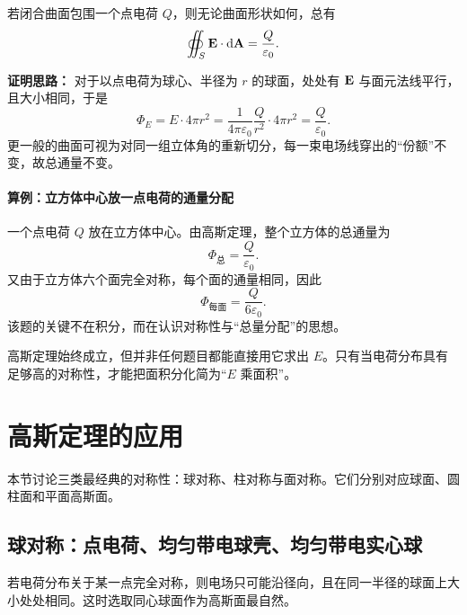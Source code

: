 \begin{theorem}[点电荷情形下高斯定理的验证]
若闭合曲面包围一个点电荷 $Q$，则无论曲面形状如何，总有
\begin{equation}
\oiint_S \vb{E}\cdot\dd\vb{A} = \frac{Q}{\varepsilon_0}.
\end{equation}
\end{theorem}

\textbf{证明思路：} 对于以点电荷为球心、半径为 $r$ 的球面，处处有 $\vb{E}$ 与面元法线平行，且大小相同，于是
\begin{equation}
\Phi_E = E\cdot 4\pi r^2 = \frac{1}{4\pi\varepsilon_0}\frac{Q}{r^2}\cdot 4\pi r^2 = \frac{Q}{\varepsilon_0}.
\end{equation}
更一般的曲面可视为对同一组立体角的重新切分，每一束电场线穿出的“份额”不变，故总通量不变。

\paragraph{算例：立方体中心放一点电荷的通量分配} 一个点电荷 $Q$ 放在立方体中心。由高斯定理，整个立方体的总通量为
\begin{equation}
\Phi_{\text{总}} = \frac{Q}{\varepsilon_0}.
\end{equation}
又由于立方体六个面完全对称，每个面的通量相同，因此
\begin{equation}
\Phi_{\text{每面}} = \frac{Q}{6\varepsilon_0}.
\end{equation}
该题的关键不在积分，而在认识对称性与“总量分配”的思想。

\begin{remark}
高斯定理始终成立，但并非任何题目都能直接用它求出 $E$。只有当电荷分布具有足够高的对称性，才能把面积分化简为“$E$ 乘面积”。
\end{remark}

\section{高斯定理的应用}

本节讨论三类最经典的对称性：球对称、柱对称与面对称。它们分别对应球面、圆柱面和平面高斯面。

\subsection*{球对称：点电荷、均匀带电球壳、均匀带电实心球}

若电荷分布关于某一点完全对称，则电场只可能沿径向，且在同一半径的球面上大小处处相同。这时选取同心球面作为高斯面最自然。

